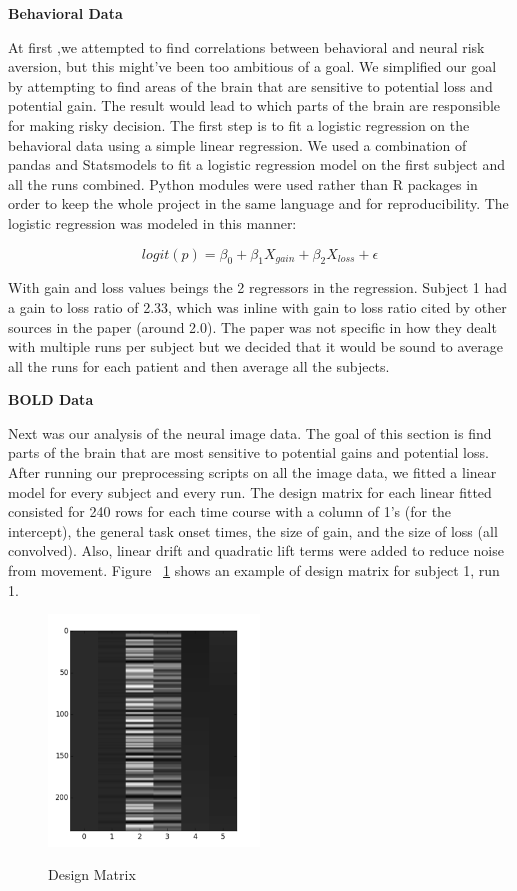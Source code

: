 \documentclass[11pt]{article}
\begin{document}
\textbf{Behavioral Data}

At first ,we attempted to find correlations between behavioral and neural risk
aversion, but this might’ve been too ambitious of a goal. We simplified our
goal by attempting to find areas of the brain that are sensitive to potential
loss and potential gain. The result would lead to which parts of the brain are
responsible for making risky decision. The first step is to fit a logistic
regression on the behavioral data using a simple linear regression. We used a
combination of pandas and Statsmodels to fit a logistic regression model on the
first subject and all the runs combined. Python modules were used rather than R
packages in order to keep the whole project in the same language and for
reproducibility. The logistic regression was modeled in this manner:

\[ logit(p) = \beta_0 + \beta_1 X_{gain} + \beta_2 X_{loss} + \epsilon \] 

With gain and loss values beings the 2 regressors in the regression. Subject 1
had a gain to loss ratio of 2.33, which was inline with gain to loss ratio
cited by other sources in the paper (around 2.0). The paper was not specific in
how they dealt with multiple runs per subject but we decided that it would be
sound to average all the runs for each patient and then average all the
subjects.

\textbf{BOLD Data}

Next was our analysis of the neural image data. The goal of this section is
find parts of the brain that are most sensitive to potential gains and
potential loss. After running our preprocessing scripts on all the image data,
we fitted a linear model for every subject and every run. The design matrix for
each linear fitted consisted for 240 rows for each time course with a column of
1’s (for the intercept), the general task onset times, the size of gain, and
the size of loss (all convolved). Also, linear drift and quadratic lift terms
were added to reduce noise from movement. Figure ~\ref{fig:design-matrix}
shows an example of design matrix for subject 1, run 1.

\begin{figure}[h]
\caption{Design Matrix}
\centering
\includegraphics[width=0.5\textwidth]{design-matrix.png}
\label{fig:design-matrix}
\end{figure}
\end{document}
